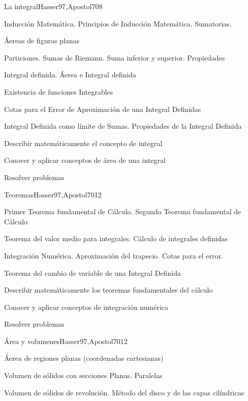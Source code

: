 \begin{syllabus}
\begin{unit}{La integral}{Hasser97,Apostol70}{8}
\begin{topics}
	\item Inducción Matemática. Principios de Inducción Matemática. Sumatorias.
	\item Áereas de figuras planas
	\item Particiones. Sumas de Riemann. Suma inferior y superior. Propiedades
	\item Integral definida. Áerea e Integral definida
	\item Existencia de funciones Integrables
	\item Cotas para el Error de Aproximación de una Integral Definidas
	\item Integral Definida como límite de Sumas. Propiedades de la Integral Definida
\end{topics}
\begin{unitgoals}
	\item Describir matemáticamente el concepto de integral
	\item Conocer y aplicar conceptos de área de una integral
	\item Resolver problemas
\end{unitgoals}
\end{unit}

\begin{unit}{Teoremas}{Hasser97,Apostol70}{12}
\begin{topics}
      \item Primer Teorema fundamental de Cálculo. Segundo Teorema fundamental de Cálculo
      \item Teorema del valor medio para integrales. Cálculo de integrales definidas
      \item Integración Numérica. Aproximación del trapecio. Cotas para el error.
      \item Teorema del cambio de variable de una Integral Definida
\end{topics}

   \begin{unitgoals}
      \item Describir matemáticamente los teoremas fundamentales del cálculo
      \item Conocer y aplicar conceptos de integración numérica
	\item Resolver problemas
   \end{unitgoals}
\end{unit}

\begin{unit}{Área y volumenes}{Hasser97,Apostol70}{12}
\begin{topics}
      \item Áerea de regiones planas (coordenadas cartesianas)
      \item Volumen de sólidos con secciones Planas. Paralelas
      \item Volumen de sólidos de revolución. Método del disco y de las capas cilíndricas
\end{topics}


\end{unit}
\end{syllabus}
